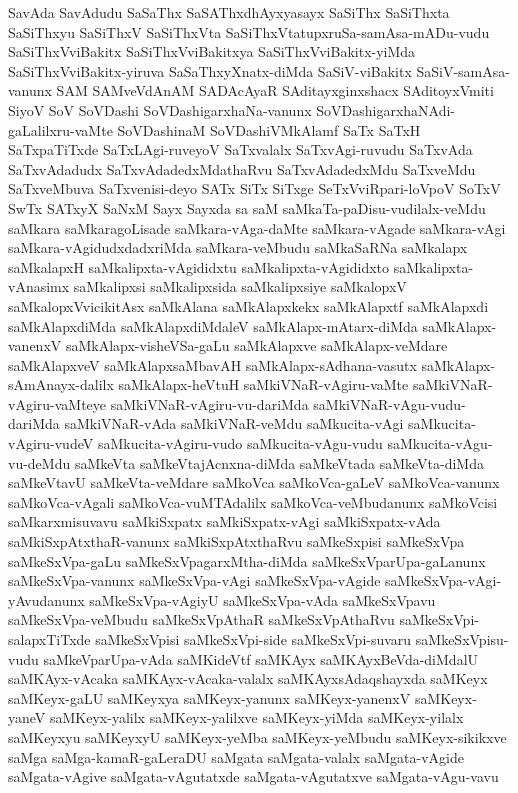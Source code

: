 {SavAda
SavAdudu
SaSaThx
SaSAThxdhAyxyasayx
SaSiThx
SaSiThxta
SaSiThxyu
SaSiThxV
SaSiThxVta
SaSiThxVtatupxruSa-samAsa-mADu-vudu
SaSiThxVviBakitx
SaSiThxVviBakitxya
SaSiThxVviBakitx-yiMda
SaSiThxVviBakitx-yiruva
SaSaThxyXnatx-diMda
SaSiV-viBakitx
SaSiV-samAsa-vanunx
SAM
SAMveVdAnAM
SADAcAyaR
SAditayxginxshacx
SAditoyxVmiti
SiyoV
SoV
SoVDashi
SoVDashigarxhaNa-vanunx
SoVDashigarxhaNAdi-gaLalilxru-vaMte
SoVDashinaM
SoVDashiVMkAlamf
SaTx
SaTxH
SaTxpaTiTxde
SaTxLAgi-ruveyoV
SaTxvalalx
SaTxvAgi-ruvudu
SaTxvAda
SaTxvAdadudx
SaTxvAdadedxMdathaRvu
SaTxvAdadedxMdu
SaTxveMdu
SaTxveMbuva
SaTxvenisi-deyo
SATx
SiTx
SiTxge
SeTxVviRpari-loVpoV
SoTxV
SwTx
SATxyX
SaNxM
Sayx
Sayxda
sa
saM
saMkaTa-paDisu-vudilalx-veMdu
saMkara
saMkaragoLisade
saMkara-vAga-daMte
saMkara-vAgade
saMkara-vAgi
saMkara-vAgidudxdadxriMda
saMkara-veMbudu
saMkaSaRNa
saMkalapx
saMkalapxH
saMkalipxta-vAgididxtu
saMkalipxta-vAgididxto
saMkalipxta-vAnasimx
saMkalipxsi
saMkalipxsida
saMkalipxsiye
saMkalopxV
saMkalopxVvicikitAsx
saMkAlana
saMkAlapxkekx
saMkAlapxtf
saMkAlapxdi
saMkAlapxdiMda
saMkAlapxdiMdaleV
saMkAlapx-mAtarx-diMda
saMkAlapx-vanenxV
saMkAlapx-visheVSa-gaLu
saMkAlapxve
saMkAlapx-veMdare
saMkAlapxveV
saMkAlapxsaMbavAH
saMkAlapx-sAdhana-vasutx
saMkAlapx-sAmAnayx-dalilx
saMkAlapx-heVtuH
saMkiVNaR-vAgiru-vaMte
saMkiVNaR-vAgiru-vaMteye
saMkiVNaR-vAgiru-vu-dariMda
saMkiVNaR-vAgu-vudu-dariMda
saMkiVNaR-vAda
saMkiVNaR-veMdu
saMkucita-vAgi
saMkucita-vAgiru-vudeV
saMkucita-vAgiru-vudo
saMkucita-vAgu-vudu
saMkucita-vAgu-vu-deMdu
saMkeVta
saMkeVtajAcnxna-diMda
saMkeVtada
saMkeVta-diMda
saMkeVtavU
saMkeVta-veMdare
saMkoVca
saMkoVca-gaLeV
saMkoVca-vanunx
saMkoVca-vAgali
saMkoVca-vuMTAdalilx
saMkoVca-veMbudanunx
saMkoVcisi
saMkarxmisuvavu
saMkiSxpatx
saMkiSxpatx-vAgi
saMkiSxpatx-vAda
saMkiSxpAtxthaR-vanunx
saMkiSxpAtxthaRvu
saMkeSxpisi
saMkeSxVpa
saMkeSxVpa-gaLu
saMkeSxVpagarxMtha-diMda
saMkeSxVparUpa-gaLanunx
saMkeSxVpa-vanunx
saMkeSxVpa-vAgi
saMkeSxVpa-vAgide
saMkeSxVpa-vAgi-yAvudanunx
saMkeSxVpa-vAgiyU
saMkeSxVpa-vAda
saMkeSxVpavu
saMkeSxVpa-veMbudu
saMkeSxVpAthaR
saMkeSxVpAthaRvu
saMkeSxVpi-salapxTiTxde
saMkeSxVpisi
saMkeSxVpi-side
saMkeSxVpi-suvaru
saMkeSxVpisu-vudu
saMkeVparUpa-vAda
saMKideVtf
saMKAyx
saMKAyxBeVda-diMdalU
saMKAyx-vAcaka
saMKAyx-vAcaka-valalx
saMKAyxsAdaqshayxda
saMKeyx
saMKeyx-gaLU
saMKeyxya
saMKeyx-yanunx
saMKeyx-yanenxV
saMKeyx-yaneV
saMKeyx-yalilx
saMKeyx-yalilxve
saMKeyx-yiMda
saMKeyx-yilalx
saMKeyxyu
saMKeyxyU
saMKeyx-yeMba
saMKeyx-yeMbudu
saMKeyx-sikikxve
saMga
saMga-kamaR-gaLeraDU
saMgata
saMgata-valalx
saMgata-vAgide
saMgata-vAgive
saMgata-vAgutatxde
saMgata-vAgutatxve
saMgata-vAgu-vavu
}
